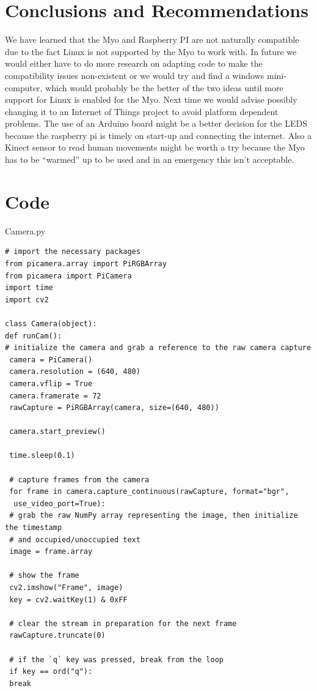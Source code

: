 \documentclass[12pt,a4paper,oneside,openany]{book}
\begin{document}
\chapter*{Conclusions and Recommendations}
We have learned that the Myo and Raspberry PI are not naturally compatible due to the fact Linux is not supported by the Myo to work with. In future we would either have to do more research on adapting code to make the compatibility issues non-existent or we would try and find a windows mini-computer, which would probably be the better of the two ideas until more support for Linux is enabled for the Myo. Next time we would advise possibly changing it to an Internet of Things project to avoid platform dependent problems. The use of an Arduino board might be a better decision for the LEDS because the raspberry pi is timely on start-up and connecting the internet. Also a Kinect sensor to read human movements might be worth a try because the Myo has to be “warmed” up to be used and in an emergency this isn’t acceptable.

\chapter*{Code}

Camera.py
\begin{verbatim}
# import the necessary packages
from picamera.array import PiRGBArray
from picamera import PiCamera
import time
import cv2

class Camera(object):
def runCam():
# initialize the camera and grab a reference to the raw camera capture
 camera = PiCamera()
 camera.resolution = (640, 480)
 camera.vflip = True
 camera.framerate = 72
 rawCapture = PiRGBArray(camera, size=(640, 480))

 camera.start_preview()

 time.sleep(0.1)

 # capture frames from the camera
 for frame in camera.capture_continuous(rawCapture, format="bgr",
  use_video_port=True):
 # grab the raw NumPy array representing the image, then initialize the timestamp
 # and occupied/unoccupied text
 image = frame.array

 # show the frame
 cv2.imshow("Frame", image)
 key = cv2.waitKey(1) & 0xFF

 # clear the stream in preparation for the next frame
 rawCapture.truncate(0)

 # if the `q` key was pressed, break from the loop
 if key == ord("q"):
 break
\end{verbatim}
\end{document}
